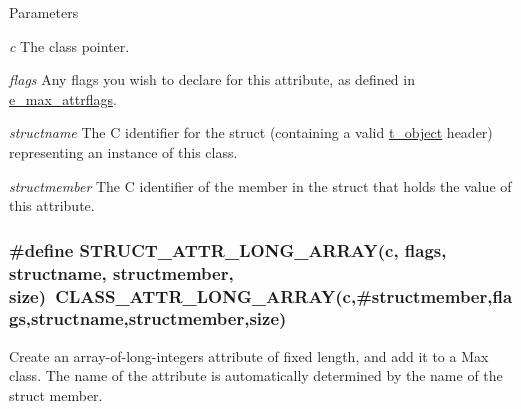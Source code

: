 \begin{DoxyParams}{Parameters}
\item[{\em c}]The class pointer. \item[{\em flags}]Any flags you wish to declare for this attribute, as defined in \hyperlink{group__attr_gaf296cfc6741bb19207f6ed8062809115}{e\_\-max\_\-attrflags}. \item[{\em structname}]The C identifier for the struct (containing a valid \hyperlink{structt__object}{t\_\-object} header) representing an instance of this class. \item[{\em structmember}]The C identifier of the member in the struct that holds the value of this attribute. \end{DoxyParams}
\hypertarget{group__attr_ga9ce1cdfb365ad9de15840fdaa5b4b1cd}{
\subsubsection[{STRUCT\_\-ATTR\_\-LONG\_\-ARRAY}]{\setlength{\rightskip}{0pt plus 5cm}\#define STRUCT\_\-ATTR\_\-LONG\_\-ARRAY(c, \/  flags, \/  structname, \/  structmember, \/  size)~CLASS\_\-ATTR\_\-LONG\_\-ARRAY(c,\#structmember,flags,structname,structmember,size)}}
\label{group__attr_ga9ce1cdfb365ad9de15840fdaa5b4b1cd}


Create an array-\/of-\/long-\/integers attribute of fixed length, and add it to a Max class. The name of the attribute is automatically determined by the name of the struct member.


